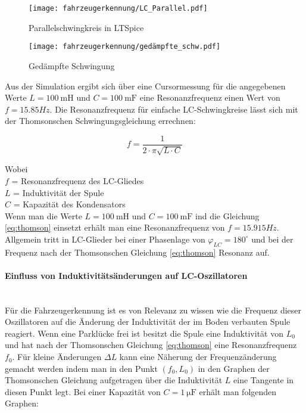 \begin{figure}[H]
    \centering
    \texttt{[image: fahrzeugerkennung/LC\_Parallel.pdf]}
    \caption{Parallelschwingkreis in LTSpice}
\end{figure}

\begin{figure}[H]
    \centering
    \texttt{[image: fahrzeugerkennung/gedämpfte\_schw.pdf]}
    \caption{Gedämpfte Schwingung}
\end{figure}

Aus der Simulation ergibt sich über eine Cursormessung für die angegebenen Werte $L = \SI{100}{\milli\henry}$ und $C = \SI{100}{\milli\farad}$ eine Resonanzfrequenz einen Wert von $f = 15.85Hz$. Die Resonanzfrequenz für einfache LC-Schwingkreise lässt sich mit der
Thomsonschen Schwingungsgleichung errechnen:

\begin{equation} \label{eq:thomson}
    f = \frac{1}{2 \cdot \pi \sqrt{L \cdot C}}
\end{equation}

Wobei \\
$f$ = Resonanzfrequenz des LC-Gliedes\\
$L$ = Induktivität der Spule\\
$C$ = Kapazität des Kondensators\\

Wenn man die Werte $L = \SI{100}{\milli\henry}$ und $C = \SI{100}{\milli\farad}$ ind die Gleichung \ref{eq:thomson} einsetzt erhält man eine Resonanzfrequenz von $f = 15.915Hz$.
Allgemein tritt in LC-Glieder bei einer Phasenlage von $\varphi_{LC} = 180^{\circ}$ und bei der Frequenz nach der Thomsonschen Gleichung \ref{eq:thomson}  Resonanz auf. 

\paragraph{Einfluss von Induktivitätsänderungen auf LC-Oszillatoren}\mbox{}\\

Für die Fahrzeugerkennung ist es von Relevanz zu wissen wie die Frequenz dieser Oszillatoren auf die Änderung der Induktivität der im Boden verbauten Spule reagiert.
Wenn eine Parklücke frei ist besitzt die Spule eine Induktivität von $L_{0}$ und hat nach der Thomsonschen Gleichung \ref{eq:thomson} eine Resonanzfrequenz $f_{0}$. Für kleine Änderungen $\Delta L$ kann eine Näherung
der Frequenzänderung gemacht werden indem man in den Punkt $(f_{0}, L_{0})$ in den Graphen der Thomsonschen Gleichung aufgetragen über die Induktivität $L$ eine Tangente in diesen Punkt legt. Bei einer 
Kapazität von $C = \SI{1}{\micro\farad}$ erhält man folgenden Graphen: 

